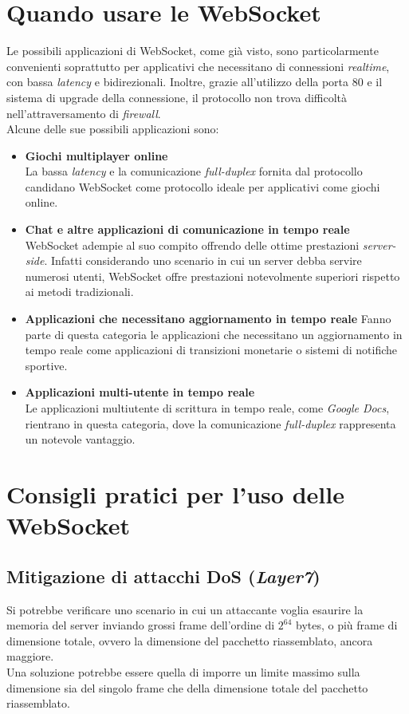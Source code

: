 \documentclass[
  oneside,
  11pt, a4paper,
  footinclude=true,
  headinclude=true,
  cleardoublepage=empty
]{scrbook}
\begin{document}
\chapter{Quando usare le WebSocket}
Le possibili applicazioni di WebSocket, come già visto, sono particolarmente convenienti soprattutto per applicativi che necessitano di connessioni \textit{realtime}, con bassa \textit{latency} e bidirezionali.
Inoltre, grazie all'utilizzo della porta 80 e il sistema di upgrade della connessione, il protocollo non trova difficoltà nell'attraversamento di \textit{firewall}.\\
Alcune delle sue possibili applicazioni sono:
\begin{itemize}
    \item \textbf{Giochi multiplayer online}\\
    La bassa \textit{latency} e la comunicazione \textit{full-duplex} fornita dal protocollo candidano WebSocket come protocollo ideale per applicativi come giochi online.
    \item \textbf{Chat e altre applicazioni di comunicazione in tempo reale}\\
    WebSocket adempie al suo compito offrendo delle ottime prestazioni \textit{server-side}.
    Infatti considerando uno scenario in cui un server debba servire numerosi utenti, WebSocket offre prestazioni notevolmente superiori rispetto ai metodi tradizionali.
    \item \textbf{Applicazioni che necessitano aggiornamento in tempo reale}
    Fanno parte di questa categoria le applicazioni che necessitano un aggiornamento in tempo reale come applicazioni di transizioni monetarie o sistemi di notifiche sportive.
    \item \textbf{Applicazioni multi-utente in tempo reale}\\
    Le applicazioni multiutente di scrittura in tempo reale, come \textit{Google Docs}, rientrano in questa categoria, dove la comunicazione \textit{full-duplex} rappresenta un notevole vantaggio.
\end{itemize}
\chapter{Consigli pratici per l'uso delle WebSocket}
\section{Mitigazione di attacchi DoS (\textit{Layer7})}
Si potrebbe verificare uno scenario in cui un attaccante voglia esaurire la memoria del server inviando grossi frame dell'ordine di $2^{64}$ bytes, o più frame di dimensione totale, ovvero la dimensione del pacchetto riassemblato, ancora maggiore.\\
Una soluzione potrebbe essere quella di imporre un limite massimo sulla dimensione sia del singolo frame che della dimensione totale del pacchetto riassemblato.
\end{document}
